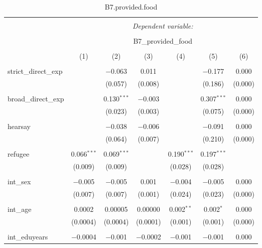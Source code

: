 
\begin{table}[H] \centering 
  \caption{B7.provided.food} 
  \label{} 
\tiny 
\begin{tabular}{@{\extracolsep{4pt}}lcccccc} 
\\[-1.8ex]\hline 
\hline \\[-1.8ex] 
 & \multicolumn{6}{c}{\textit{Dependent variable:}} \\ 
\cline{2-7} 
\\[-1.8ex] & \multicolumn{6}{c}{B7\_provided\_food} \\ 
\\[-1.8ex] & (1) & (2) & (3) & (4) & (5) & (6)\\ 
\hline \\[-1.8ex] 
 strict\_direct\_exp &  & $-$0.063 & 0.011 &  & $-$0.177 & 0.000 \\ 
  &  & (0.057) & (0.008) &  & (0.186) & (0.000) \\ 
  & & & & & & \\ 
 broad\_direct\_exp &  & 0.130$^{***}$ & $-$0.003 &  & 0.307$^{***}$ & 0.000 \\ 
  &  & (0.023) & (0.003) &  & (0.075) & (0.000) \\ 
  & & & & & & \\ 
 hearsay &  & $-$0.038 & $-$0.006 &  & $-$0.091 & 0.000 \\ 
  &  & (0.064) & (0.007) &  & (0.210) & (0.000) \\ 
  & & & & & & \\ 
 refugee & 0.066$^{***}$ & 0.069$^{***}$ &  & 0.190$^{***}$ & 0.197$^{***}$ &  \\ 
  & (0.009) & (0.009) &  & (0.028) & (0.028) &  \\ 
  & & & & & & \\ 
 int\_sex & $-$0.005 & $-$0.005 & 0.001 & $-$0.004 & $-$0.005 & 0.000 \\ 
  & (0.007) & (0.007) & (0.001) & (0.024) & (0.023) & (0.000) \\ 
  & & & & & & \\ 
 int\_age & 0.0002 & 0.00005 & 0.00000 & 0.002$^{**}$ & 0.002$^{*}$ & 0.000 \\ 
  & (0.0004) & (0.0004) & (0.0001) & (0.001) & (0.001) & (0.000) \\ 
  & & & & & & \\ 
 int\_eduyears & $-$0.0004 & $-$0.001 & $-$0.0002 & $-$0.001 & $-$0.001 & 0.000 \\ 

\end{tabular}
\end{table}
